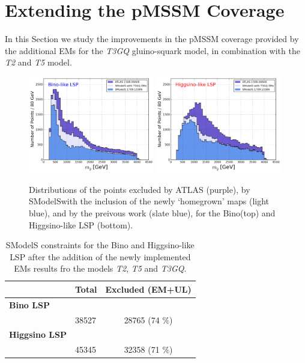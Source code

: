\documentclass[a4paper,10pt]{article}
\newcommand{\SMO}{{\sc SModelS}}
\begin{document}
\section{Extending the pMSSM Coverage}\label{sec::impact}
In this Section we study the improvements in the pMSSM coverage provided by the additional EMs for the \textit{T3GQ} gluino-squark model, in combination with the \textit{T2} and \textit{T5} model. 
\begin{figure}[!]
\begin{center}
\subfigure
{\includegraphics[width=0.49\textwidth]{PLOTS/BINO_Comparison_Gluino.png}}
\subfigure
{\includegraphics[width=0.49\textwidth]{PLOTS/HIGGSINO_Comparison_Gluino.png}}
\end{center}
\caption{Distributions of the points excluded by ATLAS (purple), by \SMO with the inclusion of the newly `homegrown' maps (light blue), and by the preivous work \cite{Ambrogi:2017lov} (slate blue), for the Bino(top) and Higgsino-like LSP (bottom).}
\label{pmssm_new_exclusion_gluino}
\end{figure}
\begin{table}[!]
\footnotesize
\begin{center}
\renewcommand{\arraystretch}{1.0}
\begin{tabular}{l l c }  \toprule  \toprule 
& \textbf{Total} & \textbf{Excluded (EM+UL)} \\ \toprule \toprule 
\textbf{Bino LSP} & &  \\
     & 38527 & 28765 (74 $\% $) \\ 
\textbf{Higgsino LSP} & &   \\
     & 45345 & 32358 (71 $\% $) \\ \bottomrule   \bottomrule  
\end{tabular}
\end{center}
\caption{SModelS constraints for the Bino and Higgsino-like LSP after the addition of the newly implemented EMs results fro the models \textit{T2}, \textit{T5} and \textit{T3GQ}.}
\label{Res_Tab_New}
\end{table}
\end{document}
